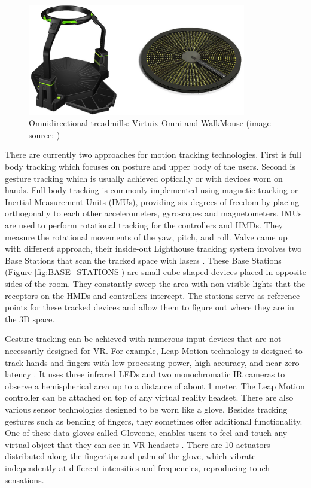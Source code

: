 \begin{figure}[th]
\centering
\includegraphics[width=0.85\textwidth]{img/vr_threadmills.png}
\caption{Omnidirectional treadmills: Virtuix Omni and WalkMouse (image source: \cite{VR_TECHNOLOGY})}
\label{fig:VIRTUX_IMAGE}
\end{figure}

There are currently two approaches for motion tracking technologies. First is full body tracking which focuses on posture and upper body of the users. Second is gesture tracking which is usually achieved optically or with devices worn on hands. Full body tracking is commonly implemented using magnetic tracking or Inertial Measurement Units (IMUs), providing six degrees of freedom by placing orthogonally to each other accelerometers, gyroscopes and magnetometers. IMUs are used to perform rotational tracking for the controllers and HMDs. They measure the rotational movements of the yaw, pitch, and roll. Valve came up with different approach, their inside-out Lighthouse tracking system involves two Base Stations that scan the tracked space with lasers \cite{VIVE}. These Base Stations (Figure \ref{fig:BASE_STATIONS}) are small cube-shaped devices placed in opposite sides of the room. They constantly sweep the area with non-visible lights that the receptors on the HMDs and controllers intercept. The stations serve as reference points for these tracked devices and allow them to figure out where they are in the 3D space. 

Gesture tracking can be achieved with numerous input devices that are not necessarily designed for VR. For example, Leap Motion technology is designed to track hands and fingers with low processing power, high accuracy, and near-zero latency \cite{LEAP_MOTION}. It uses three infrared LEDs and two monochromatic IR cameras to observe a hemispherical area up to a distance of about 1 meter.  The Leap Motion controller can be attached on top of any virtual reality headset. There are also various sensor technologies designed to be worn like a glove. Besides tracking gestures such as bending of fingers, they sometimes offer additional functionality. One of these data gloves called Gloveone, enables users to feel and touch any virtual object that they can see in VR headsets \cite{GLOVEONE}. There are 10 actuators distributed along the fingertips and palm of the glove, which vibrate independently at different intensities and frequencies, reproducing touch sensations.

